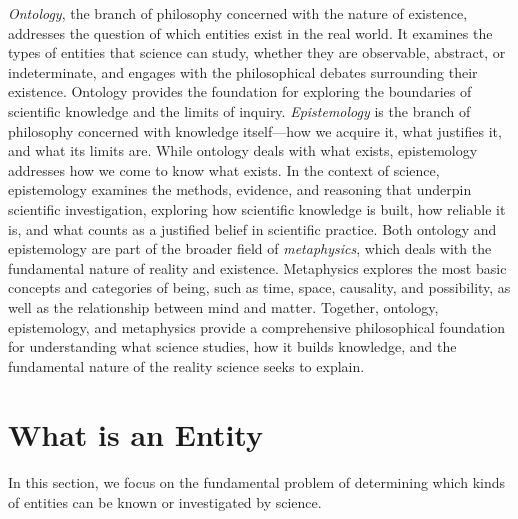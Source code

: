  \emph{Ontology}, the branch of philosophy concerned with the nature of existence, addresses the question of which entities exist in the real world. It examines the types of entities that science can study, whether they are observable, abstract, or indeterminate, and engages with the philosophical debates surrounding their existence. Ontology provides the foundation for exploring the boundaries of scientific knowledge and the limits of inquiry. \emph{Epistemology} is the branch of philosophy concerned with knowledge itself—how we acquire it, what justifies it, and what its limits are. While ontology deals with what exists, epistemology addresses how we come to know what exists. In the context of science, epistemology examines the methods, evidence, and reasoning that underpin scientific investigation, exploring how scientific knowledge is built, how reliable it is, and what counts as a justified belief in scientific practice. Both ontology and epistemology are part of the broader field of \emph{metaphysics}, which deals with the fundamental nature of reality and existence. Metaphysics explores the most basic concepts and categories of being, such as time, space, causality, and possibility, as well as the relationship between mind and matter. Together, ontology, epistemology, and metaphysics provide a comprehensive philosophical foundation for understanding what science studies, how it builds knowledge, and the fundamental nature of the reality science seeks to explain.


%
%

\section{What is an Entity}

In this section, we focus on the fundamental problem of determining which kinds of entities can be known or investigated by science.

